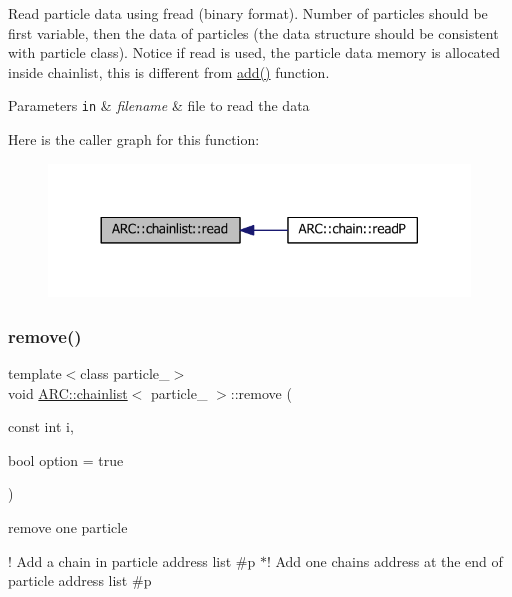Read particle data using fread (binary format). Number of particles should be first variable, then the data of particles (the data structure should be consistent with particle class). Notice if read is used, the particle data memory is allocated inside chainlist, this is different from \hyperlink{classARC_1_1chainlist_a598c1819d8e715ec0a24669e5bb06c6a}{add()} function. 
\begin{DoxyParams}[1]{Parameters}
\mbox{\tt in}  & {\em filename} & file to read the data \\
\hline
\end{DoxyParams}
Here is the caller graph for this function\+:
\nopagebreak
\begin{figure}[H]
\begin{center}
\leavevmode
\includegraphics[width=317pt]{classARC_1_1chainlist_adfa67e2ccdbdfd7ed945fa7617f90ecc_icgraph}
\end{center}
\end{figure}
\hypertarget{classARC_1_1chainlist_ac11bd643c5ae8e8ec42623041a1ef34c}{}\label{classARC_1_1chainlist_ac11bd643c5ae8e8ec42623041a1ef34c} 
\subsubsection{\texorpdfstring{remove()}{remove()}}
{\footnotesize\ttfamily template$<$class particle\+\_\+$>$ \\
void \hyperlink{classARC_1_1chainlist}{A\+R\+C\+::chainlist}$<$ particle\+\_\+ $>$\+::remove (\begin{DoxyParamCaption}\item[{const int}]{i,  }\item[{bool}]{option = {\ttfamily true} }\end{DoxyParamCaption})\hspace{0.3cm}{\ttfamily [inline]}}



remove one particle 

! Add a chain in particle address list \#p $\ast$! Add one chain\textquotesingle{}s address at the end of particle address list \#p

